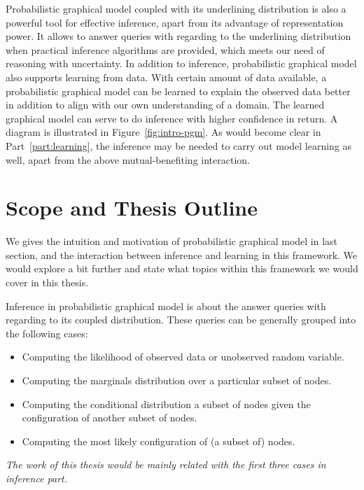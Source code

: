Probabilistic graphical model coupled with its underlining distribution is also a powerful tool for effective inference, apart from its advantage of representation power. It allows to answer queries with regarding to the underlining distribution when practical inference algorithms are provided, which meets our need of reasoning with uncertainty. In addition to inference, probabilistic graphical model also supports learning from data. With certain amount of data available, a probabilistic graphical model can be learned to explain the observed data better in addition to align with our own understanding of a domain. The learned graphical model can serve to do inference with higher confidence in return. A diagram is illustrated in Figure~\ref{fig:intro-pgm}. As would become clear in Part~\ref{part:learning}, the inference may be needed to carry out model learning as well, apart from the above mutual-benefiting interaction.



\section{Scope and Thesis Outline}
We gives the intuition and motivation of probabilistic graphical model in last section, and the interaction between inference and learning in this framework. We would explore a bit further  and state what topics within this framework we would cover in this thesis.

Inference in probabilistic graphical model is about the answer queries with regarding to its  coupled distribution. These queries can be generally grouped into the following cases:
\begin{itemize}
\item Computing the likelihood of observed data or unobserved random variable.
\item Computing the marginals distribution over a particular subset of nodes.
\item Computing the conditional distribution a subset of nodes given the configuration of another subset of nodes. 
\item Computing the most likely configuration of (a subset of) nodes.
\end{itemize}
\textit{The work of this thesis would be mainly related with the first three cases in inference part.}


